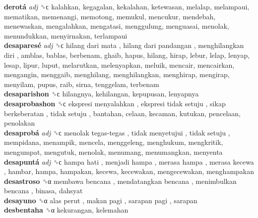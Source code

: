\textbf{derotá} \emph{adj}  ␝ϲ  kalahkan, kegagalan, kekalahan, ketewasan, melalap, melampaui, mematikan, memenangi, memotong, memukul, mencukur, mendebah, menewaskan, mengalahkan, mengatasi, menggulung, menguasai, menolak, menundukkan, menyirnakan, terlampaui  \\
\textbf{desaparesé} \emph{adj}  ␝ϲ   hilang dari mata ,  hilang dari pandangan ,  menghilangkan diri , amblas, bablas, berbenam, ghaib, hapus, hilang, hirap, lebur, lelap, lenyap, lesap, lipur, luput, melarutkan, melenyapkan, meluik, mencair, mencairkan, mengangin, menggaib, menghilang, menghilangkan, menghirap, mengirap, menyilam, pupus, raib, sirna, tenggelam, terbenam  \\
\textbf{desaparishon} ␝ϲ  hilangnya, kehilangan, kepupusan, lenyapnya  \\
\textbf{desaprobashon} ␝ϲ   ekspresi menyalahkan ,  ekspresi tidak setuju ,  sikap berkeberatan ,  tidak setuju , bantahan, celaan, kecaman, kutukan, pencelaan, penolakan  \\
\textbf{desaprobá} \emph{adj}  ␝ϲ   menolak tegas-tegas ,  tidak menyetujui ,  tidak setuju , mempidana, menampik, mencela, menggeleng, menghukum, mengkritik, mengumpat, mengutuk, menolak, menumang, menumangkan, menyenta  \\
\textbf{desapuntá} \emph{adj}  ␝ϲ   hampa hati ,  menjadi hampa ,  merasa hampa ,  merasa kecewa , hambar, hampa, hampakan, kecewa, kecewakan, mengecewakan, menghampakan  \\
\textbf{desastroso} ␝α   membawa bencana ,  mendatangkan bencana ,  menimbulkan bencana , binasa, dahsyat  \\
\textbf{desayuno} ␝α   alas perut ,  makan pagi ,  sarapan pagi , sarapan  \\
\textbf{desbentaha} ␝α  kekurangan, kelemahan  \\
